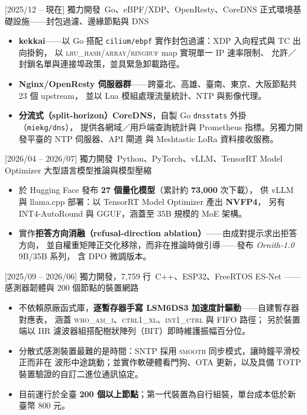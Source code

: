 \documentclass[zh]{resume}
\begin{document}
\newpage
\begin{projects}
  \project%
    {}[2025/12 -- 現在]%
    {獨力開發}%
    {\,Go、eBPF/XDP、OpenResty、CoreDNS}%
    {正式環境基礎設施——封包過濾、邊緣節點與 DNS}%
    {\begin{itemize}
      \item \textbf{kekkai}——以 Go 搭配 \texttt{cilium/ebpf} 實作封包過濾：XDP 入向程式與 TC 出向掛鉤，
        以 \textsc{lru\_hash}/\textsc{array}/\textsc{ringbuf} map 實現單一 IP 速率限制、
        允許／封鎖名單與連接埠政策，並具緊急卸載路徑。
      \item \textbf{Nginx/OpenResty 伺服器群}——跨臺北、高雄、臺南、東京、大阪節點共 23 個 upstream，
        並以 Lua 模組處理流量統計、NTP 與影像代理。
      \item \textbf{分流式（split-horizon）CoreDNS}，自製 Go \texttt{dnsstats} 外掛（\texttt{miekg/dns}），
        提供各網域／用戶端查詢統計與 Prometheus 指標。另獨力開發平臺的 NTP 伺服器、API 閘道
        與 Meshtastic LoRa 資料接收服務。
    \end{itemize}}

  \separator{0.7em}

  \project%
    {}[2026/04 -- 2026/07]%
    {獨力開發}%
    {\,Python、PyTorch、vLLM、TensorRT Model Optimizer}%
    {大型語言模型推論與模型壓縮}%
    {\begin{itemize}
      \item 於 Hugging Face 發布 \textbf{27 個量化模型}（累計約 \textbf{73,000} 次下載），
        供 vLLM 與 llama.cpp 部署：以 TensorRT Model Optimizer 產出 \textbf{NVFP4}，
        另有 INT4-AutoRound 與 GGUF，涵蓋至 35B 規模的 MoE 架構。
      \item 實作\textbf{拒答方向消融（refusal-direction ablation）}——由成對提示求出拒答方向，
        並自權重矩陣正交化移除，而非在推論時做引導——發布 \emph{Ornith-1.0} 9B/35B 系列，
        含 DPO 微調版本。
    \end{itemize}}

  \separator{0.7em}

  \project%
    {}[2025/09 -- 2026/06]%
    {獨力開發，7,759 行}%
    {\,C++、ESP32、FreeRTOS}%
    {ES-Net —— 感測器韌體與 200 個節點的裝置網路}%
    {\begin{itemize}
      \item 不依賴原廠函式庫，\textbf{逐暫存器手寫 LSM6DS3 加速度計驅動}——自建暫存器對應表，
        涵蓋 \textsc{who\_am\_i}、\textsc{ctrl1\_xl}、\textsc{int1\_ctrl} 與 FIFO 路徑；
        另於裝置端以 IIR 濾波器組搭配樹狀陣列（BIT）即時維護振幅百分位。
      \item 分散式感測裝置最難的是時間：SNTP 採用 \textsc{smooth} 同步模式，讓時鐘平滑校正而非在
        波形中途跳動；並實作軟硬體看門狗、OTA 更新，以及具備 TOTP 裝置驗證的自訂二進位通訊協定。
      \item 目前運行於全臺 \textbf{200 個以上節點}；第一代裝置為自行組裝，單台成本低於新臺幣 800 元。
    \end{itemize}}


\end{projects}
\end{document}

